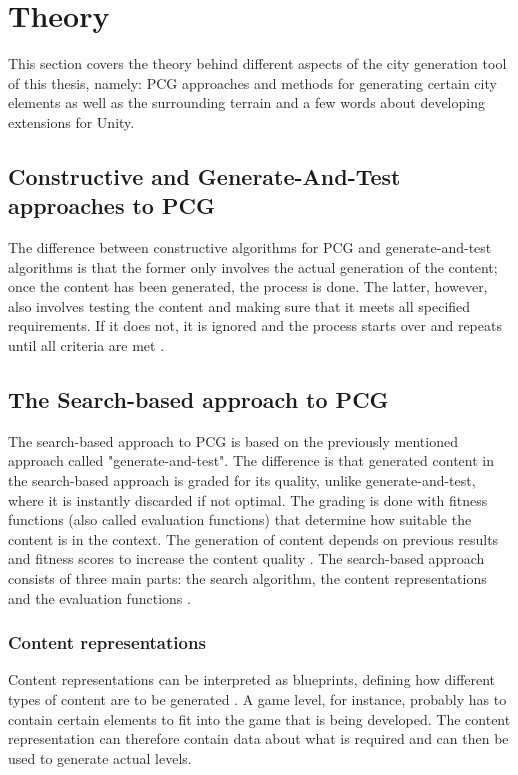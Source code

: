 \section{Theory}
\label{section:theory}
This section covers the theory behind different aspects of the city generation tool of this thesis, namely: PCG approaches and methods for generating certain city elements as well as the surrounding terrain and a few words about developing extensions for Unity.

\subsection{Constructive and Generate-And-Test approaches to PCG}
The difference between constructive algorithms for PCG and generate-and-test algorithms is that the former only involves the actual generation of the content; once the content has been generated, the process is done. The latter, however, also involves testing the content and making sure that it meets all specified requirements. If it does not, it is ignored and the process starts over and repeats until all criteria are met \cite{search-based_pcg}.

\subsection{The Search-based approach to PCG}
The search-based approach to PCG is based on the previously mentioned approach called "generate-and-test". The difference is that generated content in the search-based approach is graded for its quality, unlike generate-and-test, where it is instantly discarded if not optimal. The grading is done with fitness functions (also called evaluation functions) that determine how suitable the content is in the context. The generation of content depends on previous results and fitness scores to increase the content quality \cite{search-based_pcg}. The search-based approach consists of three main parts: the search algorithm, the content representations and the evaluation functions \cite[pp. 17-20]{shaker2016procedural}.

\subsubsection{Content representations}
Content representations can be interpreted as blueprints, defining how different types of content are to be generated \cite[p. 18]{shaker2016procedural}. A game level, for instance, probably has to contain certain elements to fit into the game that is being developed. The content representation can therefore contain data about what is required and can then be used to generate actual levels. 

